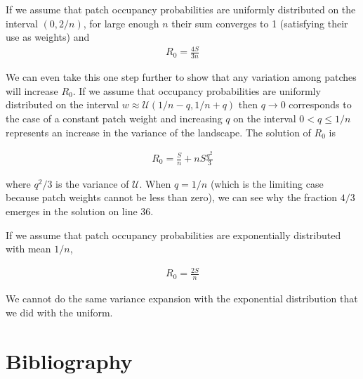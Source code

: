 If we assume that patch occupancy probabilities are uniformly distributed on the interval $(0,2/n)$, for large enough $n$ their sum converges to 1 (satisfying their use as weights) and 
\begin{align}
R_0=\frac{4S}{3n}
\end{align}

We can even take this one step further to show that any variation among patches will increase $R_0$. If we assume that occupancy probabilities are uniformly distributed on the interval $w \approx  \mathcal{U}(1/n-q,1/n+q)$ then $q\rightarrow0$ corresponds to the case of a constant patch weight and increasing $q$ on the interval $0<q\leq 1/n$ represents an increase in the variance of the landscape.  The solution of $R_0$ is

\begin{align}
R_0=\frac{S}{n}+n S \frac{q^2}{3}
\end{align}

where $q^2/3$ is the variance of $\mathcal{U}$.  When $q=1/n$ (which is the limiting case because patch weights cannot be less than zero), we can see why the fraction $4/3$ emerges in the solution on line 36. 

If we assume that patch occupancy probabilities are exponentially distributed with mean $1/n$,

\begin{align}
R_0=\frac{2S}{n}
\end{align}

We cannot do the same variance expansion with the exponential distribution that we did with the uniform.   




\section*{Bibliography}

